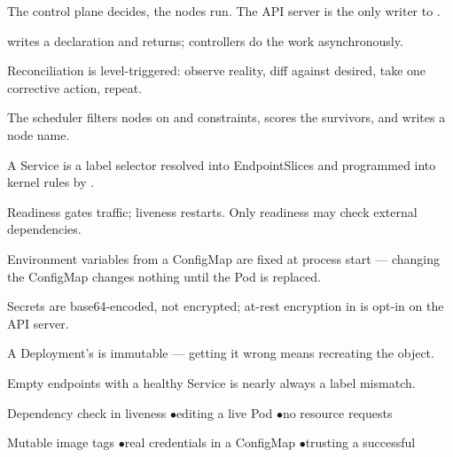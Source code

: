 
\begin{tickcheck}
  \item The control plane decides, the nodes run. The API server is the only writer to .
  \item {} writes a declaration and returns; controllers do the work asynchronously.
  \item Reconciliation is level-triggered: observe reality, diff against desired, take one corrective action, repeat.
  \item The scheduler filters nodes on  and constraints, scores the survivors, and writes a node name.
  \item A Service is a label selector resolved into EndpointSlices and programmed into kernel rules by .
  \item Readiness gates traffic; liveness restarts. Only readiness may check external dependencies.
\end{tickcheck}

\begin{wbitem}
  \item Environment variables from a ConfigMap are fixed at process start --- changing the ConfigMap changes nothing until the Pod is replaced.
  \item Secrets are base64-encoded, not encrypted; at-rest encryption in  is opt-in on the API server.
  \item A Deployment's  is immutable --- getting it wrong means recreating the object.
  \item Empty endpoints with a healthy Service is nearly always a label mismatch.
\end{wbitem}

\begin{wbitem}
  \item Dependency check in liveness \quad$\bullet$\quad editing a live Pod \quad$\bullet$\quad no resource requests
  \item Mutable image tags \quad$\bullet$\quad real credentials in a ConfigMap \quad$\bullet$\quad trusting a successful 
\end{wbitem}


